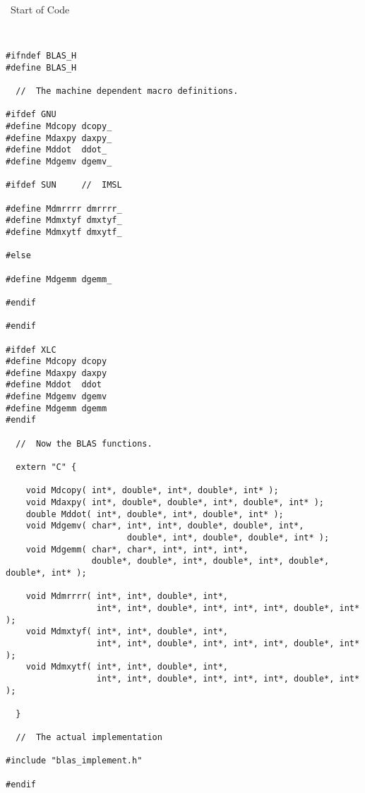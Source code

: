 \noindent
{}  \\
  \\ 
\vspace{0.1em} \small 
{\ \hrulefill Start of Code \hrulefill} 
\begin{verbatim} 


#ifndef BLAS_H
#define BLAS_H

  //  The machine dependent macro definitions.

#ifdef GNU 
#define Mdcopy dcopy_
#define Mdaxpy daxpy_
#define Mddot  ddot_
#define Mdgemv dgemv_

#ifdef SUN     //  IMSL

#define Mdmrrrr dmrrrr_
#define Mdmxtyf dmxtyf_
#define Mdmxytf dmxytf_

#else

#define Mdgemm dgemm_

#endif

#endif

#ifdef XLC
#define Mdcopy dcopy
#define Mdaxpy daxpy
#define Mddot  ddot
#define Mdgemv dgemv
#define Mdgemm dgemm
#endif

  //  Now the BLAS functions.

  extern "C" {

    void Mdcopy( int*, double*, int*, double*, int* );
    void Mdaxpy( int*, double*, double*, int*, double*, int* );
    double Mddot( int*, double*, int*, double*, int* );
    void Mdgemv( char*, int*, int*, double*, double*, int*, 
                        double*, int*, double*, double*, int* );
    void Mdgemm( char*, char*, int*, int*, int*, 
                 double*, double*, int*, double*, int*, double*, double*, int* );

    void Mdmrrrr( int*, int*, double*, int*, 
                  int*, int*, double*, int*, int*, int*, double*, int* );
    void Mdmxtyf( int*, int*, double*, int*, 
                  int*, int*, double*, int*, int*, int*, double*, int* );
    void Mdmxytf( int*, int*, double*, int*, 
                  int*, int*, double*, int*, int*, int*, double*, int* );

  }

  //  The actual implementation

#include "blas_implement.h"

#endif
\end{verbatim} 
